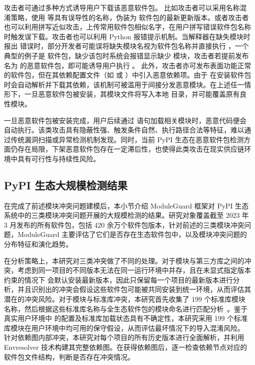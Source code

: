 攻击者可通过多种方式诱导用户下载该恶意软件包。
比如攻击者可以采用名称混淆策略，使用  等具有误导性的名称，伪装为  软件包的最新更新版本。或者攻击者也可以利用拼写近似攻击，上传常用软件包相似名字，在用户拼写错误软件包名称时触发误下载。攻击者也可以利用 Python 报错提示机制。当解释器在缺失模块时报出  错误时，部分开发者可能误将缺失模块名视为软件包名称并直接执行 ，一个典型的例子是  软件包，缺少该包时系统会报错显示缺少  模块，攻击者若提前发布名为  的恶意软件包，即可能诱导用户执行 。
此外，攻击者亦可发布表面功能正常的软件包，但在其依赖配置文件（如  或 ）中引入恶意依赖项。由于  在安装软件包时会自动解析并下载其依赖，该机制可被滥用于间接分发恶意模块。在上述任一情形下，一旦恶意软件包被安装，其模块文件将写入本地  目录，并可能覆盖原有良性模块。

一旦恶意软件包被安装完成，用户后续通过  语句加载相关模块时，恶意代码便会自动执行。该类攻击具有隐蔽性强、触发条件自然、执行路径合法等特征，难以通过传统漏洞扫描或异常检测机制发现。同时，当前 PyPI 生态在恶意软件包检测方面仍存在局限，下架恶意软件包存在一定滞后性，也使得此类攻击在现实供应链环境中具有可行性与持续性风险。

\subsection{PyPI 生态大规模检测结果}
在完成了前述模块冲突问题建模后，本小节介绍 ModuleGuard 框架对 PyPI 生态系统中的三类模块冲突问题开展的大规模检测的结果。研究对象覆盖截至 2023 年 3 月发布的所有软件包，包括 420 余万个软件包版本，针对前述的三类模块冲突问题，ModuleGuard 主要评估了它们是否存在生态软件包中，以及模块冲突问题的分布特征和演化趋势。

在分析策略上，本研究对三类冲突做了不同的处理。对于模块与第三方库之间的冲突，考虑到同一项目的不同版本无法在同一运行环境中并存，且在未显式指定版本约束的情况下  会默认安装最新版本，因此只保留每一个项目的最新版本进行分析，并且识别出的冲突会假设这些软件包可能被共同安装到统一环境，从而评估其潜在的冲突风险。对于模块与标准库冲突，本研究首先收集了 199 个标准库模块名称，然后根据这些标准库名称与全生态软件包的模块命名进行匹配分析~\cite{pylibdocumentation}。鉴于真实用户环境中  的配置及标准库加载状态具有不确定性，本研究采用 199 个标准库模块在用户环境中均可用的保守假设，从而评估最坏情况下的导入混淆风险。
针对依赖图内部冲突，本研究对每个项目的所有历史版本进行全面解析，并利用 Envresolver 技术构建其完整依赖图。在获得依赖图后，逐一检查依赖节点对应的软件包文件结构，判断是否存在冲突情况。

